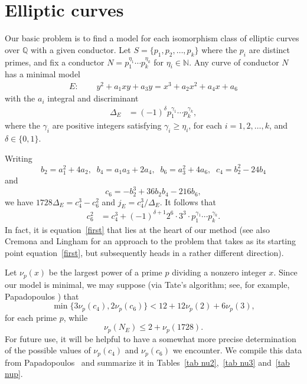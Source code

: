 \section{Elliptic curves} \label{elliptic}

Our basic problem is to find a model for each isomorphism class of elliptic curves over $\mathbb{Q}$ with a given 
conductor. Let $S=\{ p_1, p_2, \ldots, p_k \}$ where the $p_i$ are distinct primes, and fix a conductor $N= p_1^{\eta_1} \cdots p_k^{\eta_k}$ for
$\eta_i \in \mathbb{N}$.  Any curve of conductor $N$ has a minimal 
model
\begin{align*}
E:&\phantom{=} y^2 + a_1 xy + a_3 y = x^3 + a_2 x^2 + a_4 x + a_6
\end{align*}
with the $a_i$ integral and discriminant 
\begin{align*}
\Delta_E &= (-1)^\delta p_1^{\gamma_1} \cdots p_k^{\gamma_k},
\end{align*}
where the $\gamma_i$ are positive integers satisfying $\gamma_i \geq \eta_i$, for each $i = 1, 2, \ldots, k$, and $\delta \in \{ 0, 1 \}$. 

Writing
$$
b_2 = a_1^2+4a_2, \; \; b_4 = a_1 a_3 + 2 a_4, \; \; 
b_6 = a_3^2+4a_6, \; \; 
c_4 = b_2^2-24 b_4 
$$
and
$$
c_6 = -b_2^3+ 36 b_2 b_4 -216 b_6,
$$
we have
$1728 \Delta_E = c_4^3-c_6^2$ and
$j_E = c_4^3/\Delta_E$.
It follows that
\begin{align} \label{first}
c_6^2 &= c_4^3 + (-1)^{\delta +1} 2^6 \cdot 3^3 \cdot p_1^{\gamma_1} \cdots p_k^{\gamma_k}.
\end{align}
In fact, it is equation~\eqref{first} that lies at the heart of our method (see also Cremona and 
Lingham \cite{CrLi} for an approach to the problem that takes as its starting point equation~\eqref{first}, but 
subsequently heads in a rather different direction).

Let $\nu_p(x)$ be the largest power of a prime $p$ dividing a nonzero integer $x$. Since our model is minimal, we 
may suppose  (via Tate's algorithm; see, for example, Papadopoulos \cite{Pap}) that 
$$
\min \{ 3 \nu_p (c_4), 2 \nu_p (c_6) \} < 12 + 12 \nu_p(2) + 6 \nu_p(3),
$$
for each prime $p$, while
$$
\nu_p (N_E) \leq 2 + \nu_p (1728).
$$ 
For future use, it will be helpful to have a somewhat more precise determination of the possible 
values of $\nu_p(c_4)$ and $\nu_p(c_6)$ we encounter. We compile this data from Papadopoulos~\cite{Pap} and
summarize it in Tables~\ref{tab nu2},~\ref{tab nu3} and~\ref{tab nup}.

